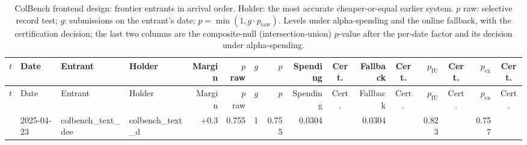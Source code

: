 {\begin{longtable}{rlllrrrrrcrcrcrc}
\caption{ColBench frontend design: frontier entrants in arrival order. Holder: the most accurate cheaper-or-equal earlier system. $p$ raw: selective record test; $g$: submissions on the entrant's date; $p = \min(1, g \cdot p_{\mathrm{raw}})$. Levels under alpha-spending and the online fallback, with the certification decision; the last two columns are the composite-null (intersection-union) $p$-value after the per-date factor and its decision under alpha-spending.}\label{tab:supp-cert-hal_colbench_frontend_design}\\
\toprule
$t$ & Date & Entrant & Holder & Margin & $p$ raw & $g$ & $p$ & Spending & Cert. & Fallback & Cert. & $p_{\mathrm{IU}}$ & Cert. & $p_{\mathrm{ex}}$ & Cert. \\
\midrule
\endfirsthead
\toprule
$t$ & Date & Entrant & Holder & Margin & $p$ raw & $g$ & $p$ & Spending & Cert. & Fallback & Cert. & $p_{\mathrm{IU}}$ & Cert. & $p_{\mathrm{ex}}$ & Cert. \\
\midrule
\endhead
\bottomrule
\endfoot
1 & 2025-04-23 & colbench\_text\_dee~ & colbench\_text\_d~ & +0.3 & 0.755 & 1 & 0.755 & 0.0304 &  & 0.0304 &  & 0.823 &  & 0.757 &  \\
\end{longtable}

}
